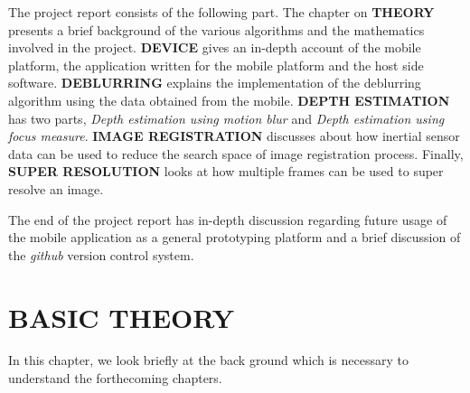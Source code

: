 \documentclass[BTech]{iitmdiss}
\begin{document}
The project report consists of the following part. The chapter on 
\textbf{THEORY} presents a brief background of the various algorithms
and the mathematics involved in the project. \textbf{DEVICE} gives an
in-depth account of the mobile platform, the application written for the
mobile platform and the host side software. \textbf{DEBLURRING} 
explains the implementation of the deblurring algorithm using the data
obtained from the mobile. \textbf{DEPTH ESTIMATION} has two parts, 
\emph{Depth estimation using motion blur} and \emph{Depth estimation 
using focus measure}. \textbf{IMAGE REGISTRATION} discusses about how
inertial sensor data can be used to reduce the search space of image 
registration process. Finally, \textbf{SUPER RESOLUTION} looks at how 
multiple frames can be used to super resolve an image.

The end of the project report has in-depth discussion regarding future
usage of the mobile application as a general prototyping platform and a
brief discussion of the \emph{github} version control system.

\chapter{BASIC THEORY}
\label{chap:basic_theory}
In this chapter, we look briefly at the back ground which is necessary 
to understand the forthecoming chapters. 
\end{document}

